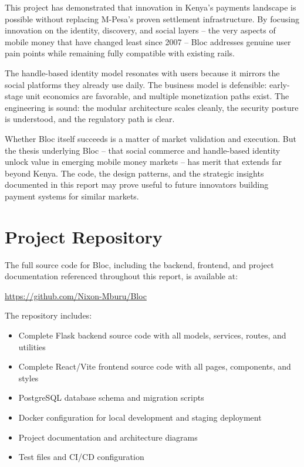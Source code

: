 \documentclass[12pt, a4paper, twoside, openright]{report}
\begin{document}
This project has demonstrated that innovation in Kenya's payments landscape is possible without replacing M-Pesa's proven settlement infrastructure. By focusing innovation on the identity, discovery, and social layers -- the very aspects of mobile money that have changed least since 2007 -- Bloc addresses genuine user pain points while remaining fully compatible with existing rails.

The handle-based identity model resonates with users because it mirrors the social platforms they already use daily. The business model is defensible: early-stage unit economics are favorable, and multiple monetization paths exist. The engineering is sound: the modular architecture scales cleanly, the security posture is understood, and the regulatory path is clear.

Whether Bloc itself succeeds is a matter of market validation and execution. But the thesis underlying Bloc -- that social commerce and handle-based identity unlock value in emerging mobile money markets -- has merit that extends far beyond Kenya. The code, the design patterns, and the strategic insights documented in this report may prove useful to future innovators building payment systems for similar markets.

\clearpage


\appendix

\chapter{Project Repository}

The full source code for Bloc, including the backend, frontend, and project documentation referenced throughout this report, is available at:

\url{https://github.com/Nixon-Mburu/Bloc}

The repository includes:

\begin{itemize}
    \item Complete Flask backend source code with all models, services, routes, and utilities
    \item Complete React/Vite frontend source code with all pages, components, and styles
    \item PostgreSQL database schema and migration scripts
    \item Docker configuration for local development and staging deployment
    \item Project documentation and architecture diagrams
    \item Test files and CI/CD configuration
\end{itemize}
\end{document}
